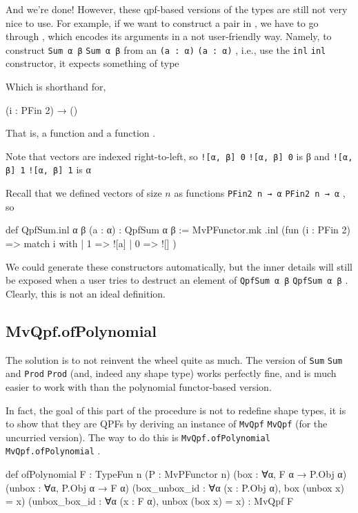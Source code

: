 \documentclass[titlepage]{report}
\newenvironment{remark}{%
\begin{framed}
\begin{trivlist}
    \item[\hskip \labelsep {\bfseries Remark:}]}%
{%
\end{trivlist}%
\end{framed}
}
\newcommand\lean[1]{%
\ifx\leanmode\undefined%
\def\leanmode{1}%
\texttt{\small #1}%
\undef\leanmode%
\else%
\texttt{#1}%
\fi%
}
\begin{document}
And we're done! However, these qpf-based versions of the types are still not very nice to use.
For example, if we want to construct a pair in , we have to go through ,
which encodes its arguments in a not user-friendly way. 
Namely, to construct \lean{Sum α β} from an \lean{(a : α)}, i.e., use the \lean{inl} constructor, 
it expects something of type
\begin{center}
\end{center}
Which is shorthand for, 
\begin{center}
    (i : PFin 2) → ()
\end{center}
That is, a function  and a function .
\begin{remark}
    Note that vectors are indexed right-to-left, so \lean{![α, β] 0} is β
    and \lean{![α, β] 1} is α
\end{remark}

Recall that we defined vectors of size $n$ as functions \lean{PFin2 n → α}, so 


\begin{leancode}
    def QpfSum.inl {α β} (a : α) : QpfSum α β :=
      MvPFunctor.mk .inl (fun (i : PFin 2) => match i with
        | 1 => ![a]
        | 0 => ![]
      )
\end{leancode}


We could generate these constructors automatically, but the inner details will still be exposed
when a user tries to destruct an element of \lean{QpfSum α β}.
Clearly, this is not an ideal definition.

\subsection{MvQpf.ofPolynomial}
The solution is to not reinvent the wheel quite as much.
The  version of \lean{Sum} and \lean{Prod} (and, indeed any shape type) works
perfectly fine, and is much easier to work with than the polynomial functor-based version.

In fact, the goal of this part of the procedure is not to redefine shape types, it is to show that
they are QPFs by deriving an instance of \lean{MvQpf} (for the uncurried version).
The way to do this is \lean{MvQpf.ofPolynomial}.

\begin{leancode}
    def ofPolynomial {F : TypeFun n} 
                     (P : MvPFunctor n) 
                     (box    : ∀{α}, F α → P.Obj α) 
                     (unbox  : ∀{α}, P.Obj α → F α) 
                     (box_unbox_id : ∀{α} (x : P.Obj α), box (unbox x) = x)
                     (unbox_box_id : ∀{α} (x : F α), unbox (box x) = x)
                  : MvQpf F
\end{leancode}
\end{document}
